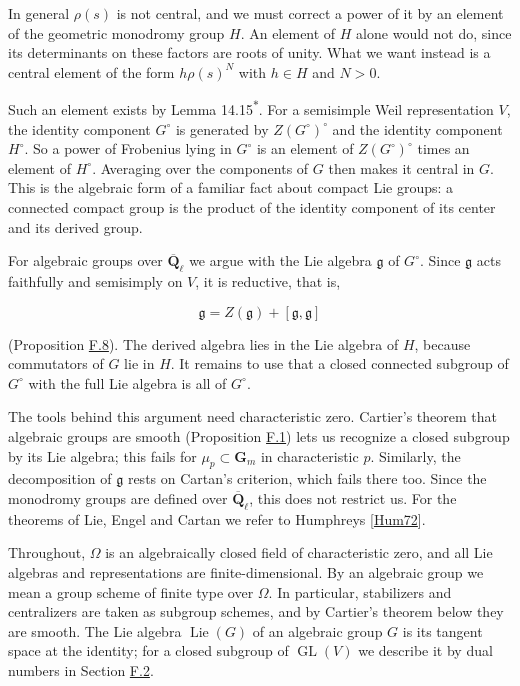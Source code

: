 \documentclass[11pt]{article}
\newcommand{\bpout}[1]{#1\textsuperscript{\hyperlink{bp-outside}{\ensuremath{\ast}}}}
\providecommand{\GL}{}\renewcommand{\GL}{\operatorname{GL}}
\begin{document}
In general \(\rho(s)\) is not central, and we must correct a power of it by an element of the geometric monodromy group \(H\). An element of \(H\) alone would not do, since its determinants on these factors are roots of unity. What we want instead is a central element of the form \(h\rho(s)^N\) with \(h\in H\) and \(N>0\).

Such an element exists by Lemma \bpout{14.15}. For a semisimple Weil representation \(V\), the identity component \(G^\circ\) is generated by \(Z(G^\circ)^\circ\) and the identity component \(H^\circ\). So a power of Frobenius lying in \(G^\circ\) is an element of \(Z(G^\circ)^\circ\) times an element of \(H^\circ\). Averaging over the components of \(G\) then makes it central in \(G\). This is the algebraic form of a familiar fact about compact Lie groups: a connected compact group is the product of the identity component of its center and its derived group.

For algebraic groups over \(\overline{\mathbf Q}_\ell\) we argue with the Lie algebra \(\mathfrak g\) of \(G^\circ\). Since \(\mathfrak g\) acts faithfully and semisimply on \(V\), it is reductive, that is,

\[
\mathfrak g=Z(\mathfrak g)+[\mathfrak g,\mathfrak g]
\]

(Proposition \hyperref[bp345]{F.8}). The derived algebra lies in the Lie algebra of \(H\), because commutators of \(G\) lie in \(H\). It remains to use that a closed connected subgroup of \(G^\circ\) with the full Lie algebra is all of \(G^\circ\).

The tools behind this argument need characteristic zero. Cartier's theorem that algebraic groups are smooth (Proposition \hyperref[bp322]{F.1}) lets us recognize a closed subgroup by its Lie algebra; this fails for \(\mu_p\subset\mathbf G_m\) in characteristic \(p\). Similarly, the decomposition of \(\mathfrak g\) rests on Cartan's criterion, which fails there too. Since the monodromy groups are defined over \(\overline{\mathbf Q}_\ell\), this does not restrict us. For the theorems of Lie, Engel and Cartan we refer to Humphreys [\hyperref[bp354]{Hum72}].

Throughout, \(\Omega\) is an algebraically closed field of characteristic zero, and all Lie algebras and representations are finite-dimensional. By an algebraic group we mean a group scheme of finite type over \(\Omega\). In particular, stabilizers and centralizers are taken as subgroup schemes, and by Cartier's theorem below they are smooth. The Lie algebra \(\operatorname{Lie}(G)\) of an algebraic group \(G\) is its tangent space at the identity; for a closed subgroup of \(\GL(V)\) we describe it by dual numbers in Section \hyperref[bp327]{F.2}.
\end{document}
